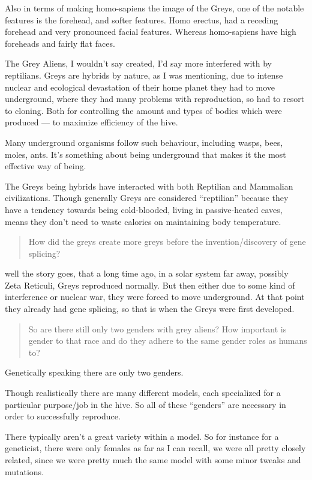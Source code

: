 Also in terms of making homo-sapiens the image of the Greys, one of the notable
features is the forehead, and softer features. Homo erectus, had a receding
forehead and very pronounced facial features. Whereas homo-sapiens have high
foreheads and fairly flat faces.

The Grey Aliens, I wouldn't say created, I'd say more interfered with by
reptilians. Greys are hybrids by nature, as I was mentioning, due to intense
nuclear and ecological devastation of their home planet they had to move
underground, where they had many problems with reproduction, so had to resort to
cloning. Both for controlling the amount and types of bodies which were produced
--- to maximize efficiency of the hive.

Many underground organisms follow such behaviour, including wasps, bees, moles,
ants. It's something about being underground that makes it the most effective
way of being.

The Greys being hybrids have interacted with both Reptilian and Mammalian
civilizations. Though generally Greys are considered ``reptilian'' because they
have a tendency towards being cold-blooded, living in passive-heated caves,
means they don't need to waste calories on maintaining body temperature.

\blockquote{How did the greys create more greys before the invention/discovery of gene
splicing?}

well the story goes, that a long time ago, in a solar system far away, possibly
Zeta Reticuli, Greys reproduced normally. But then either due to some kind of
interference or nuclear war, they were forced to move underground. At that point
they already had gene splicing, so that is when the Greys were first developed.

\blockquote{So are there still only two genders with grey aliens? How important
is gender to that race and do they adhere to the same gender roles as humans
to?}

Genetically speaking there are only two genders.

Though realistically there are many different models, each specialized for a
particular purpose/job in the hive. So all of these ``genders'' are necessary in
order to successfully reproduce.

There typically aren't a great variety within a model. So for instance for a
geneticist, there were only females as far as I can recall, we were all pretty
closely related, since we were pretty much the same model with some minor tweaks
and mutations.

